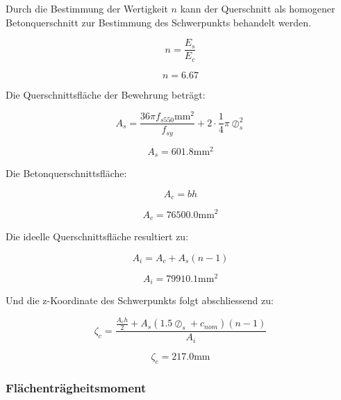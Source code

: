 \documentclass[
  letterpaper,
]{scrreprt}
\begin{document}
Durch die Bestimmung der Wertigkeit \(n\) kann der Querschnitt als
homogener Betonquerschnitt zur Bestimmung des Schwerpunkts behandelt
werden.

\begin{equation}n = \frac{E_{s}}{E_{c}}\end{equation}

\begin{equation}n = 6.67\end{equation}

Die Querschnittsfläche der Bewehrung beträgt:

\begin{equation}A_{s} = \frac{36 \pi f_{s550} \text{mm}^{2}}{f_{sy}} + 2 \cdot \frac{1}{4} \pi \oslash_{s}^{2}\end{equation}

\begin{equation}A_{s} = 601.8 \text{mm}^{2}\end{equation}

Die Betonquerschnittsfläche:

\begin{equation}A_{c} = b h\end{equation}

\begin{equation}A_{c} = 76500.0 \text{mm}^{2}\end{equation}

Die ideelle Querschnittsfläche resultiert zu:

\begin{equation}A_{i} = A_{c} + A_{s} \left(n - 1\right)\end{equation}

\begin{equation}A_{i} = 79910.1 \text{mm}^{2}\end{equation}

Und die z-Koordinate des Schwerpunkts folgt abschliessend zu:

\begin{equation}\zeta_{c} = \frac{\frac{A_{c} h}{2} + A_{s} \left(1.5 \oslash_{s} + c_{nom}\right) \left(n - 1\right)}{A_{i}}\end{equation}

\begin{equation}\zeta_{c} = 217.0 \text{mm}\end{equation}

\hypertarget{fluxe4chentruxe4gheitsmoment-1}{%
\subsubsection{Flächenträgheitsmoment}\label{fluxe4chentruxe4gheitsmoment-1}}
\end{document}
